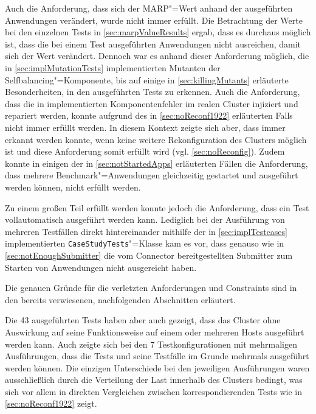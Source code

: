 Auch die Anforderung, dass sich der MARP"=Wert anhand der ausgeführten Anwendungen verändert, wurde nicht immer erfüllt.
Die Betrachtung der Werte bei den einzelnen Tests in \autoref{sec:marpValueResults} ergab, dass es durchaus möglich ist, dass die bei einem Test ausgeführten Anwendungen nicht ausreichen, damit sich der Wert verändert.
Dennoch war es anhand dieser Anforderung möglich, die in \autoref{sec:implMutationTests} implementierten Mutanten der Selfbalancing"=Komponente, bis auf einige in \autoref{sec:killingMutants} erläuterte Besonderheiten, in den ausgeführten Tests zu erkennen.
Auch die Anforderung, dass die in  implementierten Komponentenfehler im realen Cluster injiziert und repariert werden, konnte aufgrund des in \autoref{sec:noReconf1922} erläuterten Falls nicht immer erfüllt werden.
In diesem Kontext zeigte sich aber, dass immer erkannt werden konnte, wenn keine weitere Rekonfiguration des Clusters möglich ist und diese Anforderung somit erfüllt wird (vgl. \autoref{sec:noReconfig}).
Zudem konnte in einigen der in \autoref{sec:notStartedApps} erläuterten Fällen die Anforderung, dass mehrere Benchmark"=Anwendungen gleichzeitig gestartet und ausgeführt werden können, nicht erfüllt werden.

Zu einem großen Teil erfüllt werden konnte jedoch die Anforderung, dass ein Test vollautomatisch ausgeführt werden kann.
Lediglich bei der Ausführung von mehreren Testfällen direkt hintereinander mithilfe der in \autoref{sec:implTestcases} implementierten \texttt{CaseStudyTests}"=Klasse kam es vor, dass genauso wie in \autoref{sec:notEnoughSubmitter} die vom Connector bereitgestellten Submitter zum Starten von Anwendungen nicht ausgereicht haben.

Die genauen Gründe für die verletzten Anforderungen und Constraints sind in den bereits verwiesenen, nachfolgenden Abschnitten erläutert.

Die 43 ausgeführten Tests haben aber auch gezeigt, dass das Cluster ohne Auswirkung auf seine Funktionsweise auf einem oder mehreren Hosts ausgeführt werden kann.
Auch zeigte sich bei den 7 Testkonfigurationen mit mehrmaligen Ausführungen, dass die Tests und seine Testfälle im Grunde mehrmals ausgeführt werden können.
Die einzigen Unterschiede bei den jeweiligen Ausführungen waren ausschließlich durch die Verteilung der Last innerhalb des Clusters bedingt, was sich vor allem in direkten Vergleichen zwischen korrespondierenden Tests wie \zB in \autoref{sec:noReconf1922} zeigt.
